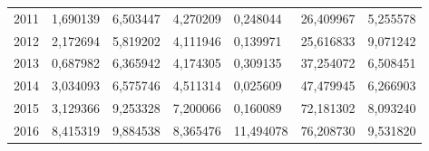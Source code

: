 \begin{table}
\begin{tabular}{p{1cm}p{2cm}p{2cm}p{2cm}p{2cm}p{2cm}p{2cm}}
 2011 &         1,690139 &                                    6,503447 &             4,270209 &          0,248044 &                   26,409967 &  5,255578 \\
 2012 &         2,172694 &                                    5,819202 &             4,111946 &          0,139971 &                   25,616833 &  9,071242 \\
 2013 &         0,687982 &                                    6,365942 &             4,174305 &          0,309135 &                   37,254072 &  6,508451 \\
 2014 &         3,034093 &                                    6,575746 &             4,511314 &          0,025609 &                   47,479945 &  6,266903 \\
 2015 &         3,129366 &                                    9,253328 &             7,200066 &          0,160089 &                   72,181302 &  8,093240 \\
 2016 &         8,415319 &                                    9,884538 &             8,365476 &         11,494078 &                   76,208730 &  9,531820 \\
\bottomrule
\end{tabular}
\end{table}
